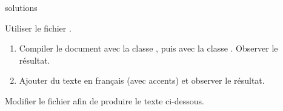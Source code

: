 {\begin{Filesave}{solutions}
\end{Filesave}

\begin{exercice}[nosol]
  Utiliser le fichier .
  \begin{enumerate}
  \item Compiler le document avec la classe , puis avec
    la classe . Observer le résultat.
  \item Ajouter du texte en français (avec accents) et observer le
    résultat.
  \end{enumerate}
\end{exercice}

\begin{exercice}
  \label{ex:base:commandes}
  Modifier le fichier  afin
  de produire le texte ci-dessous.
  \begin{demo}
  \end{demo}

\end{exercice}}
